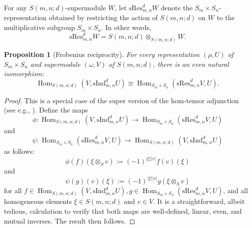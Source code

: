 \documentclass[12pt,reqno]{amsart}
\newtheorem{lemma}[theorem]{Lemma}
\newtheorem{proposition}[theorem]{Proposition}
\theoremstyle{definition}
\theoremstyle{remark}
\newcommand{\ind}{\mathrm{sInd}_{m,n}^{d}}
\newcommand{\res}{\mathrm{sRes}_{m,n}^{d}}
\newcommand{\sind}{\mathrm{sind}_{m,n}^{d}}
\DeclareMathOperator{\Hom}{Hom}
\begin{document}
For any $S(m,n;d)$-supermodule $W$, let $\res W$ denote the $S_{m}\times S_{n}$-representation obtained by restricting the action of $S(m,n;d)$ on $W$ to the multiplicative subgroup $S_{m}\times S_{n}$.
In other words,
\begin{displaymath}
    \res W = S(m,n;d)\otimes_{S(m,n;d)}W.
\end{displaymath}

\begin{proposition}[Frobenius reciprocity]\label{frobeniusReciprocity}
    For every representation $(\rho,U)$ of $S_{m}\times S_n$ and supermodule $(\omega,V)$ of $S(m,n;d)$, there is an even natural isomorphism:
    $$\Hom_{S(m,n;d)}(V,\ind U)\cong\Hom_{S_{m}\times S_{n}}(\res V,U).$$
\end{proposition}
\begin{proof}
    This is a special case of the super version of the hom-tensor adjunction (see e.g., \cite{rosso2015towers, deligne1999notes}).
    Define the maps
    $$\phi: \Hom_{S(m,n;d)}(V,\ind U)\xrightarrow[]{}\Hom_{S_{m}\times S_{n}}(\res V,U)$$
    and 
    $$\psi:\Hom_{S_{m}\times S_{n}}(\res V,U)\xrightarrow[]{}\Hom_{S(m,n;d)}(V,\ind U)$$ as follows:
    $$\phi(f)(\xi\otimes_{S}v):=(-1)^{|\xi||v|}f(v)(\xi)$$
    and
    $$\psi(g)(v)(\xi):=(-1)^{|\xi||v|}g(\xi\otimes_{S}v)$$
    for all $f\in \Hom_{S(m,n;d)}(V,\ind U), g\in \Hom_{S_{m}\times S_{n}}(\res V,U)$, and all homogeneous elements $\xi\in S(m,n;d)$ and $v\in V$. It is a straightforward, albeit tedious, calculation to verify that both maps are well-defined, linear, even, and mutual inverses. The result then follows.   
\end{proof}
\end{document}
